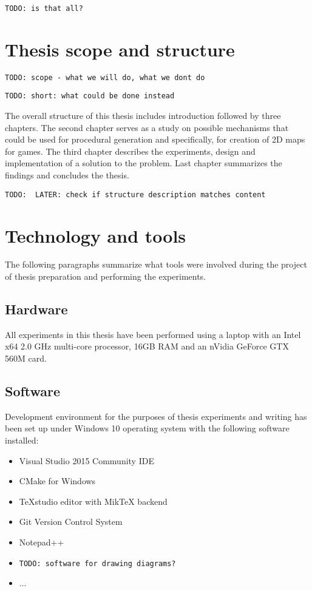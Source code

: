 \documentclass[12pt]{report}
\newcommand{\todo}[1]{}
\renewcommand{\todo}[1]{{\color{red} \par \noindent \footnotesize \texttt{TODO: {#1} }}}
\begin{document}
\todo{is that all?}

\section{Thesis scope and structure}

\todo{scope - what we will do, what we dont do}

\todo{short: what could be done instead}



The overall structure of this thesis includes introduction followed by three chapters. The second chapter serves as a study on possible mechanisms that could be used for procedural generation and specifically, for creation of 2D maps for games. The third chapter describes the experiments, design and implementation of a solution to the problem. Last chapter summarizes the findings and concludes the thesis. \todo{ LATER: check if structure description matches content}

\section{Technology and tools}

The following paragraphs summarize what tools were involved during the project of thesis preparation and performing the experiments.

\subsection{Hardware} 

All experiments in this thesis have been performed using a laptop with an Intel x64 2.0 GHz multi-core processor, 16GB RAM and an nVidia GeForce GTX 560M card.
 
\subsection{Software} 

Development environment for the purposes of thesis experiments and writing has been set up under Windows 10 operating system with the following software installed:

\begin{itemize}
	\item Visual Studio 2015 Community IDE
	\item CMake for Windows
	\item TeXstudio editor with MikTeX backend
	\item Git Version Control System
	\item Notepad++ 
	\item \todo{software for drawing diagrams?}
	\item ...
\end{itemize}
\end{document}

